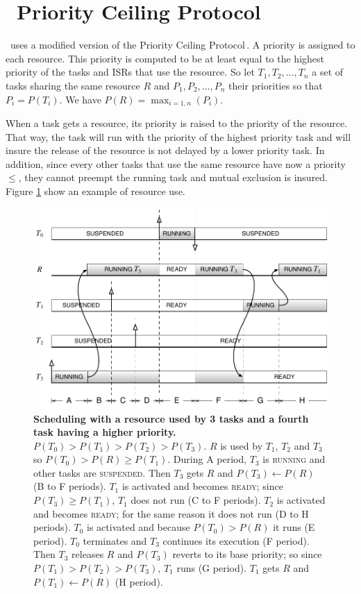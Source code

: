 \section{\osek\ Priority Ceiling Protocol}

\osek\ uses a modified version of the Priority Ceiling Protocol\,\cite{PCP}. A priority is assigned to each resource. This 
priority is computed to be at least equal to the highest priority of the tasks and ISRs that use the resource. So let $T_1, T_2, \dots, T_n$ a set of tasks sharing the same resource $R$ and $P_1, P_2, \dots, P_n$ their priorities so that $P_i = P(T_i)$. We have $P(R) = \max_{i=1,n}(P_i)$.

When a task gets a resource, its priority is raised to the priority of the resource. That way, the task will run with the priority of the highest priority task and will insure the release of the resource is not delayed by a lower priority task. In addition, since every other tasks that use the same resource have now a priority $\leq$, they cannot preempt the running task and mutual exclusion is insured. Figure \ref{fig:exampleResource} show an example of resource use.

\begin{figure}[htbp] %
   \centering
   \includegraphics[scale=.7]{pictures/schedulingResource.pdf} 
   \caption{{\bfseries Scheduling with a resource used by 3 tasks and a fourth task having a higher priority.} $P(T_0)>P(T_1)>P(T_2)>P(T_3)$. $R$ is used by $T_1$, $T_2$ and $T_3$ so $P(T_0)>P(R)\ge P(T_1)$. During A period, $T_3$ is {\sffamily\scshape running} and other tasks are {\sffamily\scshape suspended}. Then $T_3$ gets $R$ and $P(T_3) \leftarrow P(R)$ (B to F periods). $T_1$ is activated and becomes {\sffamily\scshape ready}; since $P(T_3) \ge P(T_1)$, $T_1$ does not run (C to F periods). $T_2$ is activated and becomes {\sffamily\scshape ready}; for the same reason it does not run (D to H periods). $T_0$ is activated and because $P(T_0)>P(R)$ it runs (E period). $T_0$ terminates and $T_3$ continues its execution (F period). Then $T_3$ releases $R$ and $P(T_3)$ reverts to its base priority; so since $P(T_1)>P(T_2)>P(T_3)$, $T_1$ runs (G period). $T_1$ gets $R$ and $P(T_1) \leftarrow P(R)$ (H period).}
   \label{fig:exampleResource}
\end{figure} 

